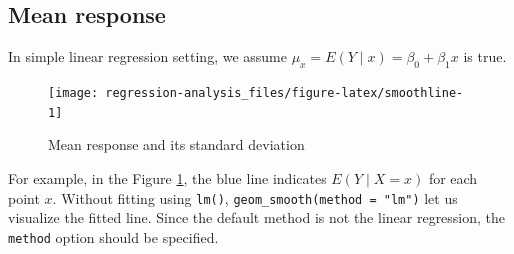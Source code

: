\documentclass[]{book}
\newenvironment{Shaded}{\begin{snugshade}}{\end{snugshade}}
\newcommand{\DataTypeTok}[1]{\textcolor[rgb]{0.13,0.29,0.53}{#1}}
\newcommand{\FloatTok}[1]{\textcolor[rgb]{0.00,0.00,0.81}{#1}}
\newcommand{\KeywordTok}[1]{\textcolor[rgb]{0.13,0.29,0.53}{\textbf{#1}}}
\newcommand{\NormalTok}[1]{#1}
\newcommand{\OperatorTok}[1]{\textcolor[rgb]{0.81,0.36,0.00}{\textbf{#1}}}
\newcommand{\StringTok}[1]{\textcolor[rgb]{0.31,0.60,0.02}{#1}}
\theoremstyle{definition}
\theoremstyle{definition}
\theoremstyle{definition}
\theoremstyle{remark}
\begin{document}
\hypertarget{mean-response}{%
\subsection{Mean response}\label{mean-response}}

In simple linear regression setting, we assume \(\mu_x = E(Y \mid x) = \beta_0 + \beta_1 x\) is true.

\begin{Shaded}
\end{Shaded}

\begin{figure}[H]

{\centering \texttt{[image: regression-analysis\_files/figure-latex/smoothline-1]} 

}

\caption{Mean response and its standard deviation}\label{fig:smoothline}
\end{figure}

For example, in the Figure \ref{fig:smoothline}, the blue line indicates \(E(Y \mid X = x)\) for each point \(x\). Without fitting using \texttt{lm()}, \texttt{geom\_smooth(method\ =\ "lm")} let us visualize the fitted line. Since the default method is not the linear regression, the \texttt{method} option should be specified.

\begin{Shaded}
\end{Shaded}
\end{document}
